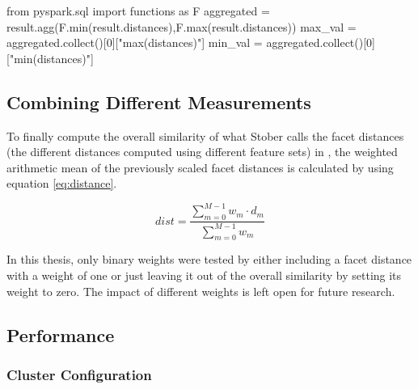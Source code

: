 \begin{pythonCode}[frame=single,label={lst:mindf2},caption={Minimum and maximum aggregation optimized},captionpos=b]
from pyspark.sql import functions as F
aggregated = result.agg(F.min(result.distances),F.max(result.distances))
max_val = aggregated.collect()[0]["max(distances)"]
min_val = aggregated.collect()[0]["min(distances)"]
\end{pythonCode}


\subsection{Combining Different Measurements}\label{weighedsum}

To finally compute the overall similarity of what Stober calls the facet distances (the different distances computed using different feature sets) in \cite[pp. 543ff]{musicdata}, the weighted arithmetic mean of the previously scaled facet distances is calculated by using equation \ref{eq:distance}.

\begin{equation} \label{eq:distance}
dist = \frac{\sum_{m = 0}^{M - 1}{w_m \cdot d_m}}{\sum_{m = 0}^{M - 1}{w_m}}
\end{equation}

\noindent In this thesis, only binary weights were tested by either including a facet distance with a weight of one or just leaving it out of the overall similarity by setting its weight to zero. The impact of different weights is left open for future research. 

\subsection{Performance}\label{sparkperf}

\subsubsection{Cluster Configuration} %

